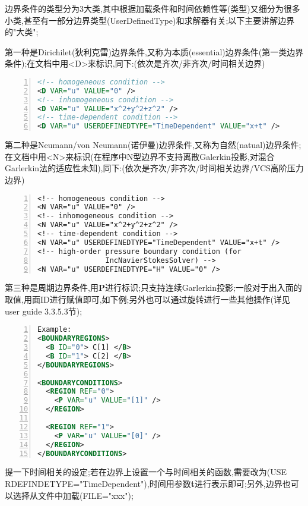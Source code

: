 边界条件的类型分为3大类,其中根据加载条件和时间依赖性等(类型)又细分为很多小类,甚至有一部分边界类型(UserDefinedType)和求解器有关;以下主要讲解边界的"大类";\par

第一种是Dirichilet(狄利克雷)边界条件,又称为本质(essential)边界条件(第一类边界条件);在文档中用<D>来标识,同下:(依次是齐次/非齐次/时间相关边界)\par
\begin{lstlisting}[frame=single,numbers=left,language=XML]
<!-- homogeneous condition -->
<D VAR="u" VALUE="0" />
<!-- inhomogeneous condition -->
<D VAR="u" VALUE="x^2+y^2+z^2" />
<!-- time-dependent condition -->
<D VAR="u" USERDEFINEDTYPE="TimeDependent" VALUE="x+t" />

\end{lstlisting}
\par

第二种是Neumann/von Neumann(诺伊曼)边界条件,又称为自然(natual)边界条件;在文档中用<N>来标识(在程序中N型边界不支持离散Galerkin投影,对混合Garlerkin法的适应性未知),同下:(依次是齐次/非齐次/时间相关边界/VCS高阶压力边界)\par
\begin{lstlisting}[frame=single,numbers=left]
<!-- homogeneous condition -->
<N VAR="u" VALUE="0" />
<!-- inhomogeneous condition -->
<N VAR="u" VALUE="x^2+y^2+z^2" />
<!-- time-dependent condition -->
<N VAR="u" USERDEFINEDTYPE="TimeDependent" VALUE="x+t" />
<!-- high-order pressure boundary condition (for 
				IncNavierStokesSolver) -->
<N VAR="u" USERDEFINEDTYPE="H" VALUE="0" />
\end{lstlisting}
\par

第三种是周期边界条件,用\textbf{P}进行标识;只支持连续Garlerkin投影;一般对于出入面的取值,用面ID进行赋值即可,如下例;另外也可以通过旋转进行一些其他操作(详见user guide 3.3.5.3节);

\begin{lstlisting}[frame=single,numbers=left,language=XML]
Example:
<BOUNDARYREGIONS>
  <B ID="0"> C[1] </B>
  <B ID="1"> C[2] </B>
</BOUNDARYREGIONS>

<BOUNDARYCONDITIONS>
  <REGION REF="0">
  	<P VAR="u" VALUE="[1]" />
  </REGION>

  <REGION REF="1">
  	<P VAR="u" VALUE="[0]" />
  </REGION>
</BOUNDARYCONDITIONS>
\end{lstlisting}
\par

提一下时间相关的设定;若在边界上设置一个与时间相关的函数,需要改为(USE RDEFINDETYPE="TimeDependent"),时间用参数\textbf{t}进行表示即可;另外,边界也可以选择从文件中加载(FILE="xxx");


